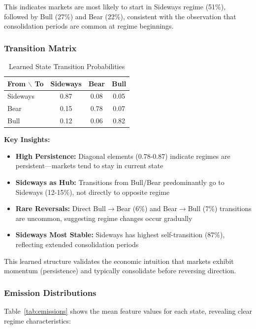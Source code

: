 \documentclass[conference]{IEEEtran}
\begin{document}
This indicates markets are most likely to start in Sideways regime (51\%), followed by Bull (27\%) and Bear (22\%), consistent with the observation that consolidation periods are common at regime beginnings.

\subsubsection{Transition Matrix}
\begin{table}[htbp]
\centering
\caption{Learned State Transition Probabilities}
\label{tab:transitions}
\begin{tabular}{lccc}
\toprule
\textbf{From $\backslash$ To} & \textbf{Sideways} & \textbf{Bear} & \textbf{Bull} \\
\midrule
Sideways & 0.87 & 0.08 & 0.05 \\
Bear & 0.15 & 0.78 & 0.07 \\
Bull & 0.12 & 0.06 & 0.82 \\
\bottomrule
\end{tabular}
\end{table}

\textbf{Key Insights:}
\begin{itemize}
\item \textbf{High Persistence:} Diagonal elements (0.78-0.87) indicate regimes are persistent---markets tend to stay in current state
\item \textbf{Sideways as Hub:} Transitions from Bull/Bear predominantly go to Sideways (12-15\%), not directly to opposite regime
\item \textbf{Rare Reversals:} Direct Bull$\rightarrow$Bear (6\%) and Bear$\rightarrow$Bull (7\%) transitions are uncommon, suggesting regime changes occur gradually
\item \textbf{Sideways Most Stable:} Sideways has highest self-transition (87\%), reflecting extended consolidation periods
\end{itemize}

This learned structure validates the economic intuition that markets exhibit momentum (persistence) and typically consolidate before reversing direction.

\subsubsection{Emission Distributions}
Table~\ref{tab:emissions} shows the mean feature values for each state, revealing clear regime characteristics:
\end{document}
